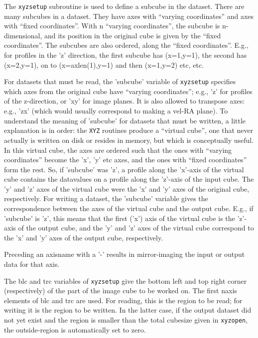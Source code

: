 The {\tt xyzsetup} subroutine is used to define a subcube in the dataset.
There are many subcubes in a dataset. They have axes with ``varying
coordinates'' and axes with ``fixed coordinates''. With n ``varying
coordinates'', the subcube is n-dimensional, and its position in the
original cube is given by the ``fixed coordinates''. The subcubes are also
ordered, along the ``fixed coordinates''.  E.g., for profiles in the 'z'
direction, the first subcube has (x=1,y=1), the second has (x=2,y=1), on
to (x=axlen(1),y=1) and then (x=1,y=2) etc, etc.

For datasets that must be read, the 'subcube' variable of {\tt xyzsetup}
specifies which axes from the original cube have ``varying coordinates'';
e.g., 'z' for profiles of the z-direction, or 'xy' for image planes. It is
also allowed to transpose axes:  e.g., 'zx' (which would usually correspond
to making a vel-RA plane). To understand the meaning of 'subcube' for
datasets that must be written, a little explanation is in order: the
{\tt XYZ} routines produce a ``virtual cube'', one that never actually is
written on disk or resides in memory, but which is conceptually useful.
In this virtual cube, the axes are ordered such that the ones with
``varying coordinates'' become the 'x', 'y' etc axes, and the ones with
``fixed coordinates'' form the rest. So, if 'subcube' was 'z', a profile
along the 'x'-axis of the virtual cube contains the datavalues on a profile
along the 'z'-axis of the input cube. The 'y' and 'z' axes of the virtual cube
were the 'x' and 'y' axes of the original cube, respectively. For writing a
dataset, the 'subcube' variable gives the correspondence between the axes
of the virtual cube and the output cube.  E.g., if 'subcube' is 'z', this
means that the first ('x') axis of the virtual cube is the 'z'-axis of
the output cube, and the 'y' and 'z' axes of the virtual cube correspond
to the 'x' and 'y' axes of the output cube, respectively.

Preceding an axisname with a '-' results in mirror-imaging the input or
output data for that axis.

The blc and trc variables of {\tt xyzsetup} give the bottom left and top right
corner (respectively) of the part of the image cube to be worked on. The
first naxis elements of blc and trc are used.  For reading, this is the
region to be read; for writing it is the region to be written. In the
latter case, if the output dataset did not yet exist and the region is
smaller than the total cubesize given in {\tt xyzopen}, the outside-region
is automatically set to zero.

